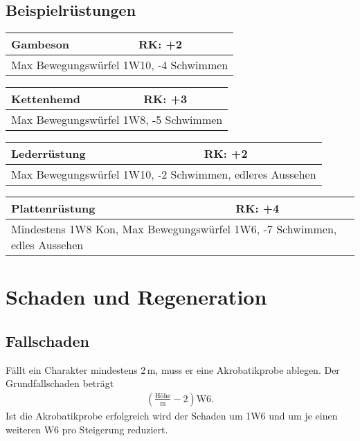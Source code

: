 \documentclass[../../Heldenanleitung2]{subfiles}
\begin{document}
\subsection{Beispielrüstungen}
\begin{multicols}{2}
\begin{tabular}{|p{}|p{}|}
\hline
\textbf{Gambeson} & RK: +2\\
\hline
\multicolumn{2}{|p{0.4\textwidth}|}{Max Bewegungswürfel 1W10, -4 Schwimmen} \\
\hline
\end{tabular} 


\begin{tabular}{|p{}|p{}|}
\hline
\textbf{Kettenhemd} & RK: +3\\
\hline
\multicolumn{2}{|p{0.4\textwidth}|}{Max Bewegungswürfel 1W8, -5 Schwimmen} \\
\hline
\end{tabular}

\begin{tabular}{|p{}|p{}|}
\hline
\textbf{Lederrüstung} & RK: +2\\
\hline
\multicolumn{2}{|p{0.4\textwidth}|}{Max Bewegungswürfel 1W10, -2 Schwimmen, edleres Aussehen} \\
\hline
\end{tabular}

\begin{tabular}{|p{}|p{}|}
\hline
\textbf{Plattenrüstung} & RK: +4\\
\hline
\multicolumn{2}{|p{0.4\textwidth}|}{Mindestens 1W8 Kon, Max Bewegungswürfel 1W6, -7 Schwimmen, edles Aussehen} \\
\hline
\end{tabular}
\end{multicols}

\section{Schaden und Regeneration}

\subsection{Fallschaden}
Fällt ein Charakter mindestens 2\,m, muss er eine Akrobatikprobe ablegen. Der Grundfallschaden beträgt
\begin{align*}
	\left(\frac{\text{Höhe}}{\text{m}}-2\right)\text{W}6.
\end{align*}
Ist die Akrobatikprobe erfolgreich wird der Schaden um 1W6 und um je einen weiteren W6 pro Steigerung reduziert.
\end{document}
